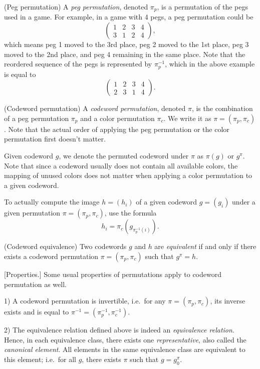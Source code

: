 \begin{definition}
(Peg permutation) A \emph{peg permutation}, denoted $\pi_p$, is a permutation of the pegs used in a game. For example, in a game with 4 pegs, a peg permutation could be
\[
\begin{pmatrix}
1 & 2 & 3 & 4 \\
3 & 1 & 2 & 4
\end{pmatrix} ,
\]
which means peg 1 moved to the 3rd place, peg 2 moved to the 1st place, peg 3 moved to the 2nd place, and peg 4 remaining in the same place. Note that the reordered sequence of the pegs is represented by $\pi_p^{-1}$, which in the above example is equal to
\[
\begin{pmatrix}
1 & 2 & 3 & 4 \\
2 & 3 & 1 & 4
\end{pmatrix} .
\]
\end{definition}

\begin{definition}
(Codeword permutation) A \emph{codeword permutation}, denoted $\pi$, is the combination of a peg permutation $\pi_p$ and a color permutation $\pi_c$. We write it as $\pi=(\pi_p,\pi_c)$. Note that the actual order of applying the peg permutation or the color permutation first doesn't matter.
\end{definition}

Given codeword $g$, we denote the permuted codeword under $\pi$ as $\pi(g)$ or $g^\pi$. Note that since a codeword usually does not contain all available colors, the mapping of unused colors does not matter when applying a color permutation to a given codeword.

To actually compute the image $h = (h_i)$ of a given codeword $g = (g_i)$ under a given permutation $\pi = (\pi_p, \pi_c)$, use the formula
\[
h_i = \pi_c\left(g_{\pi_p^{-1}(i)}\right) .
\]

\begin{definition}
(Codeword equivalence) Two codewords $g$ and $h$ are \emph{equivalent} if and only if there exists a codeword permutation $\pi=(\pi_p,\pi_c)$ such that $g^\pi = h$.
\end{definition}

[Properties.] Some usual properties of permutations apply to codeword permutation as well.

1) A codeword permutation is invertible, i.e.\ for any $\pi = (\pi_p, \pi_c)$, its inverse exists and is equal to $\pi^{-1} = (\pi_p^{-1}, \pi_c^{-1})$.

2) The equivalence relation defined above is indeed an \emph{equivalence relation}. Hence, in each equivalence class, there exists one \emph{representative}, also called the \emph{canonical element}. All elements in the same equivalence class are equivalent to this element; i.e.\ for all $g$, there exists $\pi$ such that $g = g_0^\pi$.

